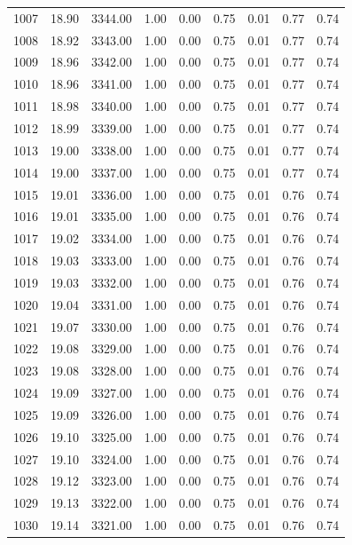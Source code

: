 \documentclass{article}\usepackage[]{graphicx}\usepackage[]{color}
\begin{document}
\begin{longtable}{rrrrrrrrr}
  1007 & 18.90 & 3344.00 & 1.00 & 0.00 & 0.75 & 0.01 & 0.77 & 0.74 \\ 
  1008 & 18.92 & 3343.00 & 1.00 & 0.00 & 0.75 & 0.01 & 0.77 & 0.74 \\ 
  1009 & 18.96 & 3342.00 & 1.00 & 0.00 & 0.75 & 0.01 & 0.77 & 0.74 \\ 
  1010 & 18.96 & 3341.00 & 1.00 & 0.00 & 0.75 & 0.01 & 0.77 & 0.74 \\ 
  1011 & 18.98 & 3340.00 & 1.00 & 0.00 & 0.75 & 0.01 & 0.77 & 0.74 \\ 
  1012 & 18.99 & 3339.00 & 1.00 & 0.00 & 0.75 & 0.01 & 0.77 & 0.74 \\ 
  1013 & 19.00 & 3338.00 & 1.00 & 0.00 & 0.75 & 0.01 & 0.77 & 0.74 \\ 
  1014 & 19.00 & 3337.00 & 1.00 & 0.00 & 0.75 & 0.01 & 0.77 & 0.74 \\ 
  1015 & 19.01 & 3336.00 & 1.00 & 0.00 & 0.75 & 0.01 & 0.76 & 0.74 \\ 
  1016 & 19.01 & 3335.00 & 1.00 & 0.00 & 0.75 & 0.01 & 0.76 & 0.74 \\ 
  1017 & 19.02 & 3334.00 & 1.00 & 0.00 & 0.75 & 0.01 & 0.76 & 0.74 \\ 
  1018 & 19.03 & 3333.00 & 1.00 & 0.00 & 0.75 & 0.01 & 0.76 & 0.74 \\ 
  1019 & 19.03 & 3332.00 & 1.00 & 0.00 & 0.75 & 0.01 & 0.76 & 0.74 \\ 
  1020 & 19.04 & 3331.00 & 1.00 & 0.00 & 0.75 & 0.01 & 0.76 & 0.74 \\ 
  1021 & 19.07 & 3330.00 & 1.00 & 0.00 & 0.75 & 0.01 & 0.76 & 0.74 \\ 
  1022 & 19.08 & 3329.00 & 1.00 & 0.00 & 0.75 & 0.01 & 0.76 & 0.74 \\ 
  1023 & 19.08 & 3328.00 & 1.00 & 0.00 & 0.75 & 0.01 & 0.76 & 0.74 \\ 
  1024 & 19.09 & 3327.00 & 1.00 & 0.00 & 0.75 & 0.01 & 0.76 & 0.74 \\ 
  1025 & 19.09 & 3326.00 & 1.00 & 0.00 & 0.75 & 0.01 & 0.76 & 0.74 \\ 
  1026 & 19.10 & 3325.00 & 1.00 & 0.00 & 0.75 & 0.01 & 0.76 & 0.74 \\ 
  1027 & 19.10 & 3324.00 & 1.00 & 0.00 & 0.75 & 0.01 & 0.76 & 0.74 \\ 
  1028 & 19.12 & 3323.00 & 1.00 & 0.00 & 0.75 & 0.01 & 0.76 & 0.74 \\ 
  1029 & 19.13 & 3322.00 & 1.00 & 0.00 & 0.75 & 0.01 & 0.76 & 0.74 \\ 
  1030 & 19.14 & 3321.00 & 1.00 & 0.00 & 0.75 & 0.01 & 0.76 & 0.74 \\ 

\end{longtable}
\end{document}
